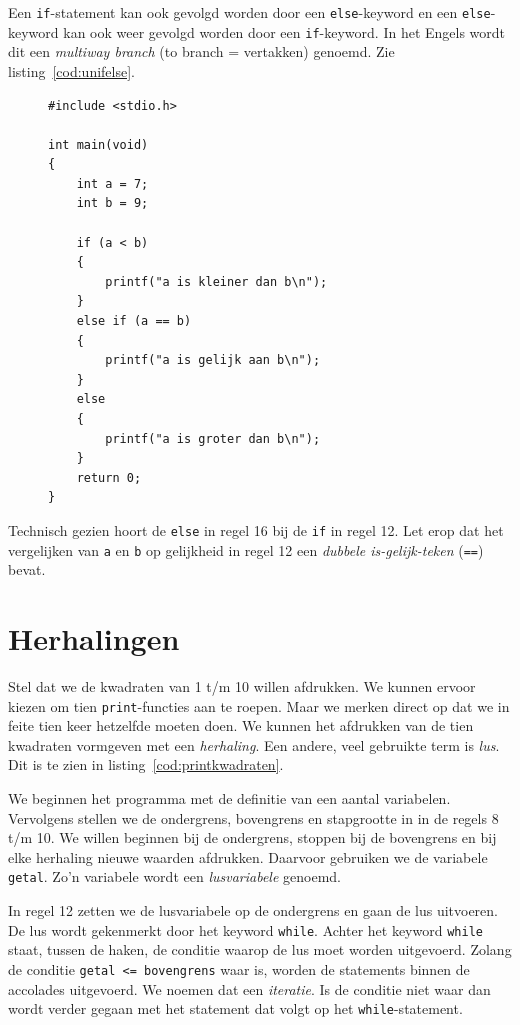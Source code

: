 Een \texttt{if}-statement kan ook gevolgd worden door een \texttt{else}-keyword en een \texttt{else}-keyword kan ook weer gevolgd worden door een \texttt{if}-keyword. In het Engels wordt dit een \textsl{multiway branch} (to branch = vertakken) genoemd. Zie listing~\ref{cod:unifelse}.

\begin{figure}[!ht]
\begin{lstlisting}[caption=Afdrukken van tekst op basis van een beslissing.,label=cod:unifelse]
#include <stdio.h>

int main(void)
{
    int a = 7;
    int b = 9;
    
    if (a < b)
    {
        printf("a is kleiner dan b\n");
    }
    else if (a == b) 
    {
        printf("a is gelijk aan b\n");
    }
    else
    {
        printf("a is groter dan b\n");
    }
    return 0;
}
\end{lstlisting}
\end{figure}

Technisch gezien hoort de \texttt{else} in regel 16 bij de \texttt{if} in regel 12. Let erop dat het vergelijken van \texttt{a} en \texttt{b} op gelijkheid in regel 12 een \textsl{dubbele is-gelijk-teken} (\texttt{==})\indexop{==} bevat.

 
\section{Herhalingen}
Stel dat we de kwadraten van 1 t/m 10 willen afdrukken. We kunnen ervoor kiezen om tien \texttt{print}-functies aan te roepen. Maar we merken direct op dat we in feite tien keer hetzelfde moeten doen. We kunnen het afdrukken van de tien kwadraten vormgeven met een \textsl{herhaling}. Een andere, veel gebruikte term is \textsl{lus}. Dit is te zien in listing~\ref{cod:printkwadraten}.


We beginnen het programma met de definitie van een aantal variabelen. Vervolgens stellen we de ondergrens, bovengrens en stapgrootte in in de regels 8 t/m 10. We willen beginnen bij de ondergrens, stoppen bij de bovengrens en bij elke herhaling nieuwe waarden afdrukken. Daarvoor gebruiken we de variabele \texttt{getal}. Zo'n variabele wordt een \textsl{lusvariabele} genoemd.

In regel 12 zetten we de lusvariabele op de ondergrens en gaan de lus uitvoeren. De lus wordt gekenmerkt door het keyword \texttt{while}. Achter het keyword \texttt{while} staat, tussen de haken, de conditie waarop de lus moet worden uitgevoerd.
Zolang de conditie \mbox{\texttt{getal <= bovengrens}} waar is, worden de statements binnen de accolades uitgevoerd. We noemen dat een \textsl{iteratie}. Is de conditie niet waar dan wordt verder gegaan met het statement dat volgt op het \texttt{while}-statement.


